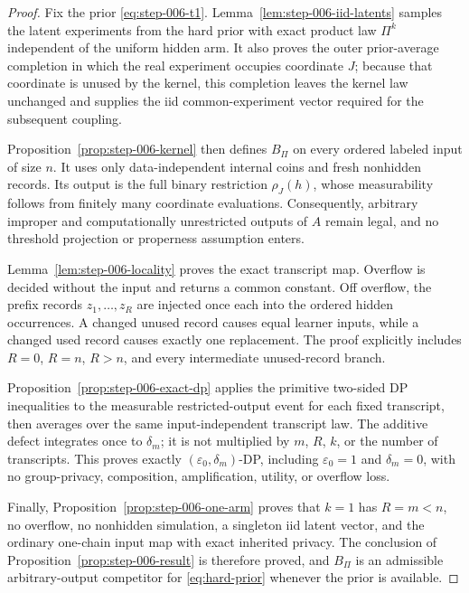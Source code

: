 \begin{proof}

Fix the prior \eqref{eq:step-006-t1}. Lemma~\ref{lem:step-006-iid-latents} samples the latent experiments from the hard prior with exact product law \(\Pi^k\) independent of the uniform hidden arm. It also proves the outer prior-average completion in which the real experiment occupies coordinate \(J\); because that coordinate is unused by the kernel, this completion leaves the kernel law unchanged and supplies the iid common-experiment vector required for the subsequent coupling.

Proposition~\ref{prop:step-006-kernel} then defines \(B_\Pi\) on every ordered labeled input of size \(n\).  It uses only data-independent internal coins and fresh nonhidden records. Its output is the full binary restriction \(\rho_J(h)\), whose measurability follows from finitely many coordinate evaluations. Consequently, arbitrary improper and computationally unrestricted outputs of \(A\) remain legal, and no threshold projection or properness assumption enters.

Lemma~\ref{lem:step-006-locality} proves the exact transcript map. Overflow is decided without the input and returns a common constant. Off overflow, the prefix records \(z_1,\ldots,z_R\) are injected once each into the ordered hidden occurrences. A changed unused record causes equal learner inputs, while a changed used record causes exactly one replacement. The proof explicitly includes \(R=0\), \(R=n\), \(R>n\), and every intermediate unused-record branch.

Proposition~\ref{prop:step-006-exact-dp} applies the primitive two-sided DP inequalities to the measurable restricted-output event for each fixed transcript, then averages over the same input-independent transcript law. The additive defect integrates once to \(\delta_m\); it is not multiplied by \(m\), \(R\), \(k\), or the number of transcripts. This proves exactly \((\varepsilon_0,\delta_m)\)-DP, including \(\varepsilon_0=1\) and \(\delta_m=0\), with no group-privacy, composition, amplification, utility, or overflow loss.

Finally, Proposition~\ref{prop:step-006-one-arm} proves that \(k=1\) has \(R=m<n\), no overflow, no nonhidden simulation, a singleton iid latent vector, and the ordinary one-chain input map with exact inherited privacy. The conclusion of Proposition~\ref{prop:step-006-result} is therefore proved, and \(B_\Pi\) is an admissible arbitrary-output competitor for \eqref{eq:hard-prior} whenever the prior is available.

\end{proof}

